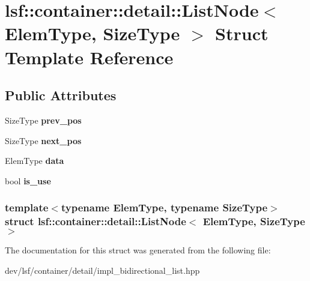 \hypertarget{structlsf_1_1container_1_1detail_1_1ListNode}{
\section{lsf::container::detail::ListNode$<$ ElemType, SizeType $>$ Struct Template Reference}
\label{structlsf_1_1container_1_1detail_1_1ListNode}
}
\subsection*{Public Attributes}
\begin{DoxyCompactItemize}
\item 
\hypertarget{structlsf_1_1container_1_1detail_1_1ListNode_a9ef84b4f828ea496a8f43cf407448e8f}{
SizeType {\bfseries prev\_\-pos}}
\label{structlsf_1_1container_1_1detail_1_1ListNode_a9ef84b4f828ea496a8f43cf407448e8f}

\item 
\hypertarget{structlsf_1_1container_1_1detail_1_1ListNode_a6d36accad5ea01e5671108545a127ecb}{
SizeType {\bfseries next\_\-pos}}
\label{structlsf_1_1container_1_1detail_1_1ListNode_a6d36accad5ea01e5671108545a127ecb}

\item 
\hypertarget{structlsf_1_1container_1_1detail_1_1ListNode_a5fe40d90bb1917cfc5ee0d5ba81bd535}{
ElemType {\bfseries data}}
\label{structlsf_1_1container_1_1detail_1_1ListNode_a5fe40d90bb1917cfc5ee0d5ba81bd535}

\item 
\hypertarget{structlsf_1_1container_1_1detail_1_1ListNode_adf6bfb284745b5e6065b5cc70d84c88b}{
bool {\bfseries is\_\-use}}
\label{structlsf_1_1container_1_1detail_1_1ListNode_adf6bfb284745b5e6065b5cc70d84c88b}

\end{DoxyCompactItemize}
\subsubsection*{template$<$typename ElemType, typename SizeType$>$ struct lsf::container::detail::ListNode$<$ ElemType, SizeType $>$}



The documentation for this struct was generated from the following file:\begin{DoxyCompactItemize}
\item 
dev/lsf/container/detail/impl\_\-bidirectional\_\-list.hpp\end{DoxyCompactItemize}
